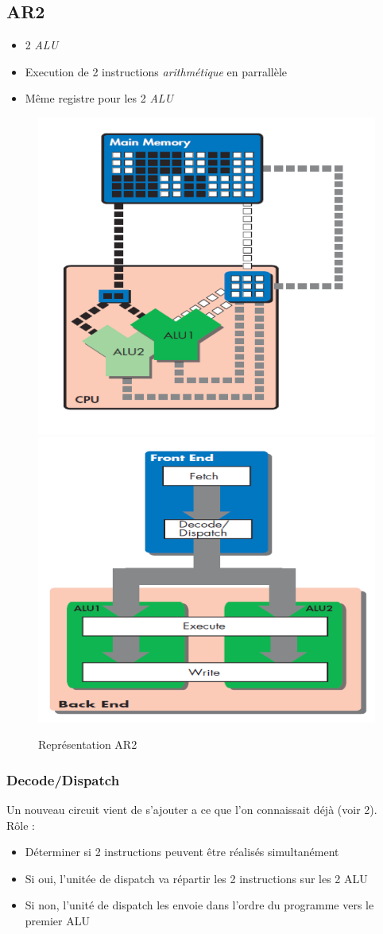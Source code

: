 \documentclass[a4paper]{article}
\begin{document}
    \subsection{AR2}
    \begin{itemize}
      \item 2 \emph{ALU}
      \item Execution de 2 instructions \emph{arithmétique} en parrallèle
      \item Même registre pour les 2 \emph{ALU}
    \end{itemize}
    \begin{figure}[H]
      \includegraphics[width = 0.5 \textwidth]{images/2.PNG}
      \includegraphics[width = 0.5 \textwidth]{images/3.PNG}
      \caption{Représentation AR2}
    \end{figure}

    \subsubsection{Decode/Dispatch}
    Un nouveau circuit vient de s'ajouter a ce que l'on connaissait déjà (voir \figurename{2}).\\
    Rôle :
    \begin{itemize}
      \item Déterminer si 2 instructions peuvent être réalisés simultanément
      \item Si oui, l'unitée de dispatch va répartir les 2 instructions sur les 2 ALU
      \item Si non, l’unité de dispatch les envoie dans l’ordre du programme vers le premier ALU
    \end{itemize}
\end{document}
